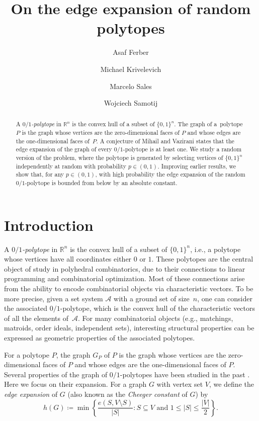 \documentclass[11pt,a4paper,oneside,reqno]{amsart}
\author{Asaf Ferber}
\author{Michael Krivelevich}
\author{Marcelo Sales}
\author{Wojciech Samotij}
\title[On the edge expansion of random polytopes]{On the edge expansion of random polytopes}
\newcommand{\RR}{\mathbb{R}}
\newcommand{\cA}{\mathcal{A}}
\begin{document}
\begin{abstract}
  A \emph{$0/1$-polytope} in $\RR^n$ is the convex hull of a subset of $\{0,1\}^n$. The graph of a~polytope $P$ is the graph whose vertices are the zero-dimensional faces of $P$ and whose edges are the one-dimensional faces of~$P$.  A conjecture of Mihail and Vazirani states that the edge expansion of the graph of every $0/1$-polytope is at least one.  We study a random version of the problem, where the polytope is generated by selecting vertices of $\{0,1\}^n$ independently at random with probability $p\in (0,1)$.  Improving earlier results, we show that, for any $p\in (0,1)$, with high probability the edge expansion of the random $0/1$-polytope is bounded from below by an absolute constant.
\end{abstract}

\maketitle

\section{Introduction}\label{sec:intro}

A \emph{$0/1$-polytope} in $\RR^n$ is the convex hull of a subset of $\{0,1\}^n$, i.e., a polytope whose vertices have all coordinates either $0$ or $1$. These polytopes are the central object of study in polyhedral combinatorics, due to their connections to linear programming and combinatorial optimization. Most of these connections arise from the ability to encode combinatorial objects via characteristic vectors. To be more precise, given a set system $\cA$ with a ground set of size~$n$, one can consider the associated $0/1$-polytope, which is the convex hull of the characteristic vectors of all the elements of~$\cA$. For many combinatorial objects (e.g., matchings, matroids, order ideals, independent sets), interesting structural properties can be expressed as geometric properties of the associated polytopes.

For a polytope $P$, the graph $G_P$ of $P$ is the graph whose vertices are the zero-dimensional faces of $P$ and whose edges are the one-dimensional faces of $P$. Several properties of the graph of $0/1$-polytopes have been studied in the past \cites{combpolytope06, graphpolytope84, graphpolytopeII84, graphpolytope89, cutpolytope}. Here we focus on their expansion.
For a graph $G$ with vertex set $V$, we define the \emph{edge expansion} of $G$ (also known as the \emph{Cheeger constant} of $G$) by
\[
  h(G) \coloneqq \min\left\{\frac{e(S,V\setminus S)}{|S|} : S \subseteq V \text{ and } 1 \leq |S| \leq \frac{|V|}{2}\right\}.
\]
\end{document}
